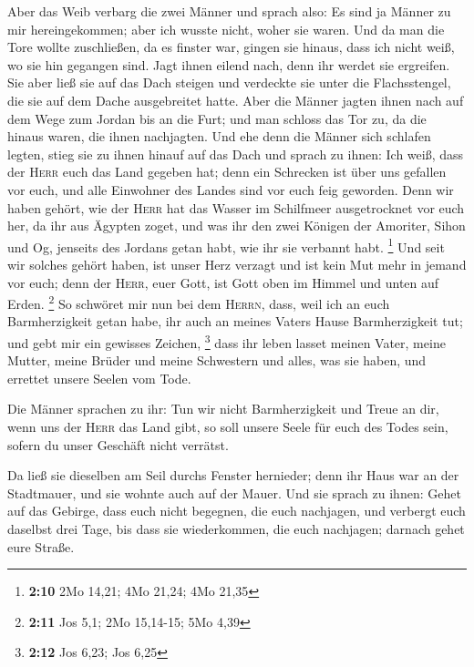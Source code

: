  Aber das Weib verbarg die zwei Männer und sprach also: Es
sind ja Männer zu mir hereingekommen; aber ich wusste nicht, woher sie
waren.  Und da man die Tore wollte zuschließen, da es
finster war, gingen sie hinaus, dass ich nicht weiß, wo sie hin gegangen
sind. Jagt ihnen eilend nach, denn ihr werdet sie ergreifen.
 Sie aber ließ sie auf das Dach steigen und verdeckte sie
unter die Flachsstengel, die sie auf dem Dache ausgebreitet hatte.
 Aber die Männer jagten ihnen nach auf dem Wege zum Jordan
bis an die Furt; und man schloss das Tor zu, da die hinaus waren, die
ihnen nachjagten.  Und ehe denn die Männer sich schlafen
legten, stieg sie zu ihnen hinauf auf das Dach  und sprach
zu ihnen: Ich weiß, dass der \textsc{Herr} euch das Land gegeben hat;
denn ein Schrecken ist über uns gefallen vor euch, und alle Einwohner
des Landes sind vor euch feig geworden.  Denn wir haben
gehört, wie der \textsc{Herr} hat das Wasser im Schilfmeer ausgetrocknet
vor euch her, da ihr aus Ägypten zoget, und was ihr den zwei Königen der
Amoriter, Sihon und Og, jenseits des Jordans getan habt, wie ihr sie
verbannt habt. \footnote{\textbf{2:10} 2Mo 14,21; 4Mo 21,24; 4Mo 21,35}
 Und seit wir solches gehört haben, ist unser Herz
verzagt und ist kein Mut mehr in jemand vor euch; denn der
\textsc{Herr}, euer Gott, ist Gott oben im Himmel und unten auf Erden.
\footnote{\textbf{2:11} Jos 5,1; 2Mo 15,14-15; 5Mo 4,39} 
So schwöret mir nun bei dem \textsc{Herrn}, dass, weil ich an euch
Barmherzigkeit getan habe, ihr auch an meines Vaters Hause
Barmherzigkeit tut; und gebt mir ein gewisses Zeichen, \footnote{\textbf{2:12}
  Jos 6,23; Jos 6,25}  dass ihr leben lasset meinen
Vater, meine Mutter, meine Brüder und meine Schwestern und alles, was
sie haben, und errettet unsere Seelen vom Tode.

 Die Männer sprachen zu ihr: Tun wir nicht Barmherzigkeit
und Treue an dir, wenn uns der \textsc{Herr} das Land gibt, so soll
unsere Seele für euch des Todes sein, sofern du unser Geschäft nicht
verrätst.

 Da ließ sie dieselben am Seil durchs Fenster hernieder;
denn ihr Haus war an der Stadtmauer, und sie wohnte auch auf der Mauer.
 Und sie sprach zu ihnen: Gehet auf das Gebirge, dass
euch nicht begegnen, die euch nachjagen, und verbergt euch daselbst drei
Tage, bis dass sie wiederkommen, die euch nachjagen; darnach gehet eure
Straße.

